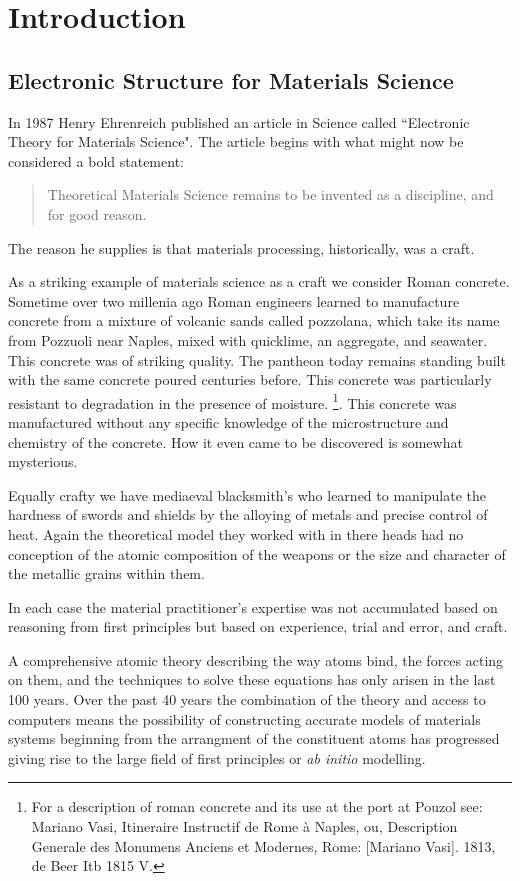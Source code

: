 \chapter{Introduction}
\section{Electronic Structure for Materials Science}
In 1987 Henry Ehrenreich published an article in Science called
``Electronic Theory for Materials Science". The article begins
with what might now be considered a bold statement:

\begin{quote}
Theoretical Materials Science remains to be invented as a discipline, and for good reason.
\end{quote}

The reason he supplies is that materials processing, historically, was a craft. 

As a striking example of materials science as a craft we consider Roman concrete.
Sometime over two millenia ago Roman engineers learned to manufacture concrete 
from a mixture of volcanic sands called pozzolana,
which take its name from Pozzuoli near Naples, mixed with quicklime, an aggregate, and seawater.
This concrete was of striking quality. The pantheon today remains standing 
built with the same concrete poured centuries before.
This concrete was particularly resistant to degradation in the presence of moisture.
\footnote{For a description of roman concrete and its use at the port at Pouzol see: Mariano Vasi, 
Itineraire Instructif de Rome à Naples, ou, Description Generale des Monumens Anciens et Modernes, 
Rome: [Mariano Vasi]. 1813, de Beer Itb 1815 V.}. 
This concrete was manufactured without any specific knowledge of the microstructure and 
chemistry of the concrete. How it even came to be discovered is somewhat mysterious.

Equally crafty we have mediaeval blacksmith's who learned to manipulate the 
hardness of swords and shields by the alloying of metals and precise control of heat. 
Again the theoretical model they worked with in there heads had no conception of 
the atomic composition of the weapons or the size and character of the metallic grains within them. 

In each case the material practitioner's expertise was not accumulated based on reasoning 
from first principles but based on experience, trial and error, and craft.

A comprehensive atomic theory describing the way atoms bind, the forces acting on them, 
and the techniques to solve these equations has only arisen in the last 100 years. 
Over the past 40 years the combination of the theory and access to computers 
means the possibility of constructing accurate models of materials 
systems beginning from the arrangment of the constituent atoms has
progressed giving rise to the large field of first principles or {\it ab initio} modelling.

